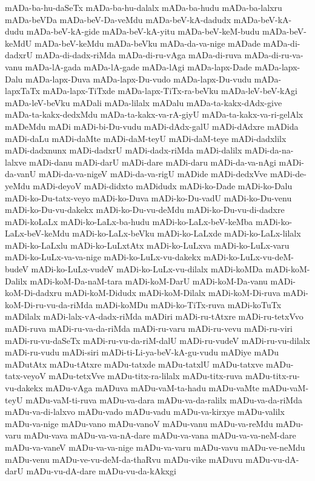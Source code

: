 {mADa-ba-hu-daSeTx
mADa-ba-hu-dalalx
mADa-ba-hudu
mADa-ba-lalxru
mADa-beVDa
mADa-beV-Da-veMdu
mADa-beV-kA-dadudx
mADa-beV-kA-dudu
mADa-beV-kA-gide
mADa-beV-kA-yitu
mADa-beV-keM-budu
mADa-beV-keMdU
mADa-beV-keMdu
mADa-beVku
mADa-da-va-nige
mADade
mADa-di-dadxrU
mADa-di-dadx-riMda
mADa-di-ru-vAga
mADa-di-ruva
mADa-di-ru-va-vanu
mADa-lA-gada
mADa-lA-gade
mADa-lAgi
mADa-lapx-Dade
mADa-lapx-Dalu
mADa-lapx-Duva
mADa-lapx-Du-vudo
mADa-lapx-Du-vudu
mADa-lapxTaTx
mADa-lapx-TiTxde
mADa-lapx-TiTx-ra-beVku
mADa-leV-beV-kAgi
mADa-leV-beVku
mADali
mADa-lilalx
mADalu
mADa-ta-kakx-dAdx-give
mADa-ta-kakx-dedxMdu
mADa-ta-kakx-va-rA-giyU
mADa-ta-kakx-va-ri-gelAlx
mADeMdu
mADi
mADi-bi-Du-vudu
mADi-dAdx-galU
mADi-dAdxre
mADida
mADi-daLu
mADi-daMte
mADi-daM-teyU
mADi-daM-teye
mADi-dadxlilx
mADi-dadxnunx
mADi-dadxrU
mADi-dadx-riMda
mADi-dalilx
mADi-da-na-lalxve
mADi-danu
mADi-darU
mADi-dare
mADi-daru
mADi-da-va-nAgi
mADi-da-vanU
mADi-da-va-nigeV
mADi-da-va-rigU
mADide
mADi-dedxVve
mADi-de-yeMdu
mADi-deyoV
mADi-didxto
mADidudx
mADi-ko-Dade
mADi-ko-Dalu
mADi-ko-Du-tatx-veyo
mADi-ko-Duva
mADi-ko-Du-vadU
mADi-ko-Du-venu
mADi-ko-Du-vu-dakekx
mADi-ko-Du-vu-deMdu
mADi-ko-Du-vu-di-dadxre
mADi-koLaLx
mADi-ko-LaLx-ba-hudu
mADi-ko-LaLx-beV-keMba
mADi-ko-LaLx-beV-keMdu
mADi-ko-LaLx-beVku
mADi-ko-LaLxde
mADi-ko-LaLx-lilalx
mADi-ko-LaLxlu
mADi-ko-LuLxtAtx
mADi-ko-LuLxva
mADi-ko-LuLx-varu
mADi-ko-LuLx-va-va-nige
mADi-ko-LuLx-vu-dakekx
mADi-ko-LuLx-vu-deM-budeV
mADi-ko-LuLx-vudeV
mADi-ko-LuLx-vu-dilalx
mADi-koMDa
mADi-koM-Dalilx
mADi-koM-Da-naM-tara
mADi-koM-DarU
mADi-koM-Da-vanu
mADi-koM-Di-dadxru
mADi-koM-Didudx
mADi-koM-Dilalx
mADi-koM-Di-ruva
mADi-koM-Di-ru-vu-da-riMda
mADi-koMDu
mADi-ko-TiTx-ruva
mADi-koTuTx
mADilalx
mADi-lalx-vA-dadx-riMda
mADiri
mADi-ru-tAtxre
mADi-ru-tetxVvo
mADi-ruva
mADi-ru-va-da-riMda
mADi-ru-varu
mADi-ru-vevu
mADi-ru-viri
mADi-ru-vu-daSeTx
mADi-ru-vu-da-riM-dalU
mADi-ru-vudeV
mADi-ru-vu-dilalx
mADi-ru-vudu
mADi-siri
mADi-ti-Li-ya-beV-kA-gu-vudu
mADiye
mADu
mADutAtx
mADu-tAtxre
mADu-tatxde
mADu-tatxlU
mADu-tatxve
mADu-tatx-veyoV
mADu-tetxVve
mADu-titx-ra-lilalx
mADu-titx-ruva
mADu-titx-ru-vu-dakekx
mADu-vAga
mADuva
mADu-vaM-ta-hadu
mADu-vaMte
mADu-vaM-teyU
mADu-vaM-ti-ruva
mADu-va-dara
mADu-va-da-ralilx
mADu-va-da-riMda
mADu-va-di-lalxvo
mADu-vado
mADu-vadu
mADu-va-kirxye
mADu-valilx
mADu-va-nige
mADu-vano
mADu-vanoV
mADu-vanu
mADu-va-reMdu
mADu-varu
mADu-vava
mADu-va-va-nA-dare
mADu-va-vana
mADu-va-va-neM-dare
mADu-va-vaneV
mADu-va-va-nige
mADu-va-varu
mADu-vavu
mADu-ve-neMdu
mADu-venu
mADu-ve-vu-deM-da-thaRvu
mADu-vike
mADuvu
mADu-vu-dA-darU
mADu-vu-dA-dare
mADu-vu-da-kAkxgi
}
